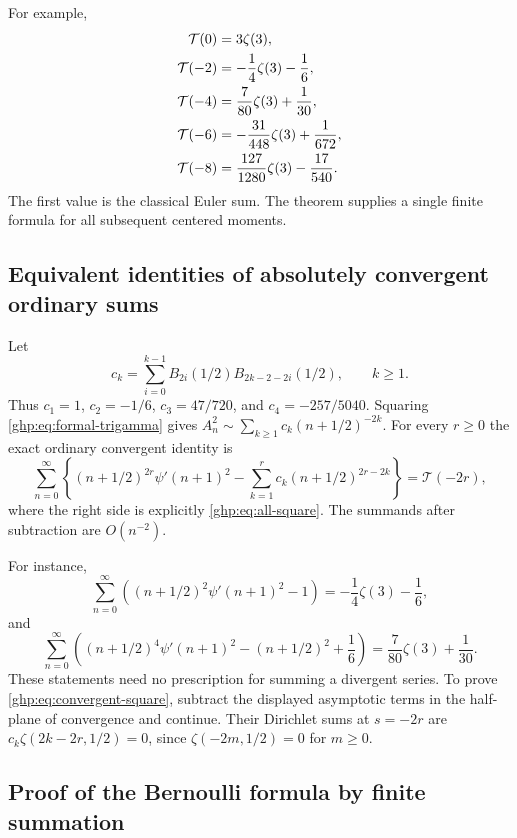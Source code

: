 For example,
\begin{align}\label{ghp:eq:square-table}
 \mathcal T(0)&=3\zeta(3),\notag\\
 \mathcal T(-2)&=-\frac14\zeta(3)-\frac16,\notag\\
 \mathcal T(-4)&=\frac7{80}\zeta(3)+\frac1{30},\notag\\
 \mathcal T(-6)&=-\frac{31}{448}\zeta(3)+\frac1{672},\notag\\
 \mathcal T(-8)&=\frac{127}{1280}\zeta(3)-\frac{17}{540}.
\end{align}
The first value is the classical Euler sum. The theorem supplies a
single finite formula for all subsequent centered moments.

\subsection{Equivalent identities of absolutely convergent ordinary sums}

Let
\begin{equation}\label{ghp:def:ck}
 c_k=\sum_{i=0}^{k-1}B_{2i}(1/2)B_{2k-2-2i}(1/2),\qquad k\geq1.
\end{equation}
Thus $c_1=1$, $c_2=-1/6$, $c_3=47/720$, and
$c_4=-257/5040$. Squaring \eqref{ghp:eq:formal-trigamma} gives
$A_n^2\sim\sum_{k\geq1}c_k(n+1/2)^{-2k}$.
For every $r\geq0$ the exact ordinary convergent identity is
\begin{equation}\label{ghp:eq:convergent-square}
 \sum_{n=0}^{\infty}\left\{(n+1/2)^{2r}\psi'(n+1)^2
       -\sum_{k=1}^r c_k(n+1/2)^{2r-2k}\right\}
       =\mathcal T(-2r),
\end{equation}
where the right side is explicitly \eqref{ghp:eq:all-square}. The
summands after subtraction are $O(n^{-2})$.

For instance,
\[
 \sum_{n=0}^{\infty}\left((n+1/2)^2\psi'(n+1)^2-1\right)
       =-\frac14\zeta(3)-\frac16,
\]
and
\[
 \sum_{n=0}^{\infty}\left((n+1/2)^4\psi'(n+1)^2
                         -(n+1/2)^2+\frac16\right)
       =\frac7{80}\zeta(3)+\frac1{30}.
\]
These statements need no prescription for summing a divergent series.
To prove \eqref{ghp:eq:convergent-square}, subtract the displayed
asymptotic terms in the half-plane of convergence and continue. Their
Dirichlet sums at $s=-2r$ are
$c_k\zeta(2k-2r,1/2)=0$, since
$\zeta(-2m,1/2)=0$ for $m\geq0$.

\subsection{Proof of the Bernoulli formula by finite summation}


